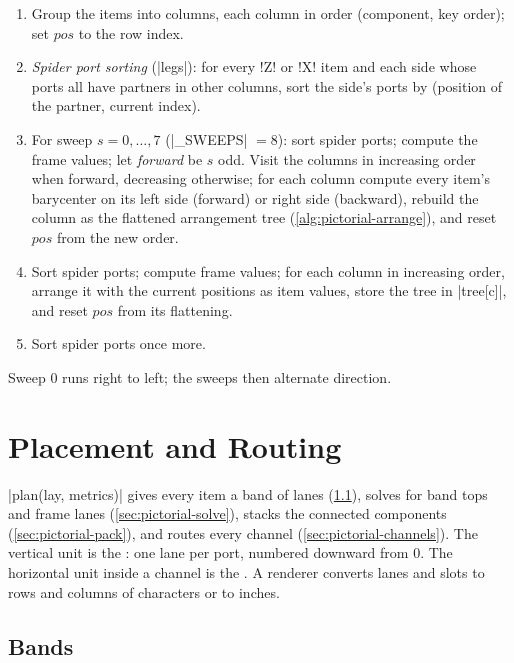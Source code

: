 \begin{algorithm}\label{alg:pictorial-order}
\begin{enumerate}
  \item Group the items into columns, each column in order (component, key order); set
    $\mathit{pos}$ to the row index.
  \item \emph{Spider port sorting} (\py|legs|): for every \code!Z! or \code!X! item and each
    side whose ports all have partners in other columns, sort the side's ports by
    (position of the partner, current index).
  \item For sweep $s = 0, \dots, 7$ (\py|_SWEEPS| $=8$): sort spider ports; compute the frame
    values; let \emph{forward} be $s$ odd. Visit the columns in increasing order when forward,
    decreasing otherwise; for each column compute every item's barycenter on its left side
    (forward) or right side (backward), rebuild the column as the flattened arrangement tree
    (\cref{alg:pictorial-arrange}), and reset $\mathit{pos}$ from the new order.
  \item Sort spider ports; compute frame values; for each column in increasing order, arrange
    it with the current positions as item values, store the tree in \py|tree[c]|, and reset
    $\mathit{pos}$ from its flattening.
  \item Sort spider ports once more.
\end{enumerate}
Sweep 0 runs right to left; the sweeps then alternate direction.
\end{algorithm}

\section{Placement and Routing}\label{sec:pictorial-routing}

\py|plan(lay, metrics)| gives every item a band of lanes (\cref{sec:pictorial-bands}), solves for
band tops and frame lanes (\cref{sec:pictorial-solve}), stacks the connected components
(\cref{sec:pictorial-pack}), and routes every channel (\cref{sec:pictorial-channels}). The
vertical unit is the : one lane per port, numbered downward from 0. The horizontal
unit inside a channel is the . A renderer converts lanes and slots to rows and columns
of characters or to inches.

\subsection{Bands}\label{sec:pictorial-bands}

